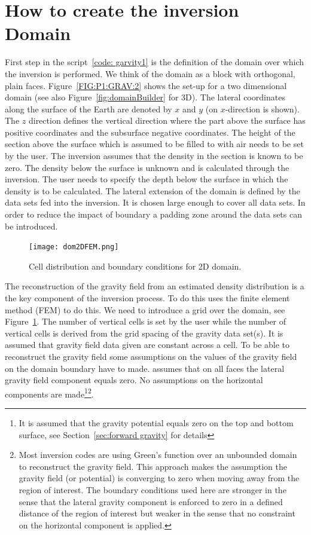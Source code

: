\section{How to create the inversion Domain}
First step in the script~\ref{code: garvity1} is the definition of the domain over which the inversion is performed.
We think of the domain as a block with orthogonal, plain faces. Figure~\ref{FIG:P1:GRAV:2} shows the set-up for 
a two dimensional domain (see also Figure~\ref{fig:domainBuilder} for 3D). The lateral coordinates along the 
surface of the Earth are denoted by $x$ and $y$ (on $x$-direction is shown). The $z$ direction defines the
vertical direction where the part above the surface has positive coordinates and the 
subsurface negative coordinates. The height of the section above the surface which is assumed to be filled to with air 
needs to be set by the user. The inversion assumes that the density in the section is known to be zero. The density
below the surface is unknown and is calculated through the inversion. The user needs to specify the depth below
the surface in which the density is to be calculated. 
The lateral extension of the domain is defined by the data sets fed into the inversion. It is chosen large enough
to cover all data sets. In order to reduce the impact of boundary a padding zone around the data sets can be introduced.
  
\begin{figure}
\centering
\texttt{[image: dom2DFEM.png]}
\caption{Cell distribution and boundary conditions for 2D domain.}
\label{FIG:P1:GRAV:3}
\end{figure}

The reconstruction of the gravity field from an estimated density distribution is a the key component of the inversion process.
To do this \downunder uses the finite element method (FEM) to do this. We need to introduce a grid over the domain, see Figure~\ref{FIG:P1:GRAV:3}.
The number of vertical cells is set by the user while the number of vertical cells is derived from the grid spacing of the 
gravity data set(s). It is assumed that gravity field data given are constant across a cell. 
To be able to reconstruct the gravity field some assumptions on the values of the gravity field on the domain boundary
have to made. \downunder assumes that on all faces the lateral gravity field component equals 
zero. No assumptions on the 
horizontal components are made\footnote{It is assumed that the gravity potential equals zero on the top and bottom
surface, see Section~\ref{sec:forward gravity} for details}\footnote{Most inversion codes are using Green's function over an unbounded domain to reconstruct the gravity field. This approach
makes the assumption the gravity field (or potential) is converging to zero when moving away from the region of interest. The 
boundary conditions used here are stronger in the sense that the lateral gravity component is enforced to zero in 
a defined distance of the region of interest but weaker in the sense that no constraint on the horizontal component is applied.}.
   
